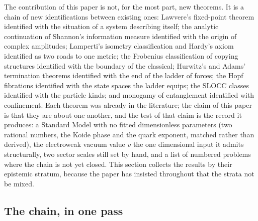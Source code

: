 The contribution of this paper is not, for the most part, new theorems. It is a chain of new
identifications between existing ones: Lawvere's fixed-point theorem identified with the
situation of a system describing itself; the analytic continuation of Shannon's information
measure identified with the origin of complex amplitudes; Lamperti's isometry classification and
Hardy's axiom identified as two roads to one metric; the Frobenius classification of copying
structures identified with the boundary of the classical; Hurwitz's and Adams' termination
theorems identified with the end of the ladder of forces; the Hopf fibrations identified with
the state spaces the ladder equips; the SLOCC classes identified with the particle kinds; and
monogamy of entanglement identified with confinement. Each theorem was already in the
literature; the claim of this paper is that they are about one another, and the test of that
claim is the record it produces: a Standard Model with no fitted dimensionless parameters (two
rational numbers, the Koide phase and the quark exponent, matched rather than derived), the
electroweak vacuum value $v$ the one dimensional input it admits structurally, two sector scales
still set by hand, and a list of numbered problems where the chain is not yet closed. This
section collects the results by their epistemic stratum, because the paper has insisted
throughout that the strata not be mixed.

\subsection{The chain, in one pass}

